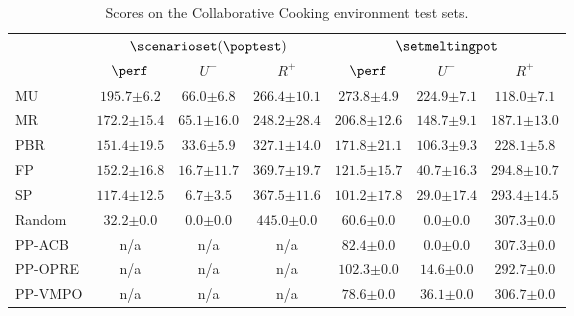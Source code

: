 \begin{table}[t]
    \setlength{\tabcolsep}{2.6pt}
    \centering
    \caption{Scores on the Collaborative Cooking environment test sets.}
    \label{tab:cooking.test}
    \begin{adjustbox}{center}

    \begin{tabular}{lcccccc}\toprule
    & \multicolumn{3}{c}{$\scenarioset(\poptest)$} & \multicolumn{3}{c}{$\setmeltingpot$}
    \\\cmidrule(lr){2-4}\cmidrule(lr){5-7}
               & $\perf$ & $U^-$ & $R^+$ & $\perf$ & $U^-$ & $R^+$ \\ \midrule
            MU & $\mathbf{195.7 {\scriptscriptstyle\pm 6.2}}$ & $\mathbf{66.0 {\scriptscriptstyle\pm 6.8}}$ & $266.4 {\scriptscriptstyle\pm 10.1}$ & $\mathbf{273.8 {\scriptscriptstyle\pm 4.9}}$ & $\mathbf{224.9 {\scriptscriptstyle\pm 7.1}}$ & $\mathbf{118.0 {\scriptscriptstyle\pm 7.1}}$ \\
            MR & $172.2 {\scriptscriptstyle\pm 15.4}$ & $65.1 {\scriptscriptstyle\pm 16.0}$ & $\mathbf{248.2 {\scriptscriptstyle\pm 28.4}}$ & $206.8 {\scriptscriptstyle\pm 12.6}$ & $148.7 {\scriptscriptstyle\pm 9.1}$ & $187.1 {\scriptscriptstyle\pm 13.0}$ \\ \hdashline
            PBR & $151.4 {\scriptscriptstyle\pm 19.5}$ & $33.6 {\scriptscriptstyle\pm 5.9}$ & $327.1 {\scriptscriptstyle\pm 14.0}$ & $171.8{\scriptscriptstyle \pm 21.1}$ & $106.3 {\scriptscriptstyle\pm 9.3}$ & $228.1 {\scriptscriptstyle\pm 5.8}$ \\
            FP & $152.2 {\scriptscriptstyle\pm 16.8}$ & $16.7 {\scriptscriptstyle\pm 11.7}$ & $369.7 {\scriptscriptstyle\pm 19.7}$ & $121.5 {\scriptscriptstyle\pm 15.7}$ & $40.7 {\scriptscriptstyle\pm 16.3}$ & $294.8 {\scriptscriptstyle\pm 10.7}$ \\
            SP & $117.4 {\scriptscriptstyle\pm 12.5}$ & $6.7 {\scriptscriptstyle\pm 3.5}$ & $367.5 {\scriptscriptstyle\pm 11.6}$ & $101.2 {\scriptscriptstyle\pm 17.8}$ & $29.0 {\scriptscriptstyle\pm 17.4}$ & $293.4 {\scriptscriptstyle\pm 14.5}$ \\
            Random & $32.2 {\scriptscriptstyle\pm 0.0}$ & $0.0 {\scriptscriptstyle\pm 0.0}$ & $445.0 {\scriptscriptstyle\pm 0.0}$ & $60.6 {\scriptscriptstyle\pm 0.0}$ & $0.0 {\scriptscriptstyle\pm 0.0}$ & $307.3 {\scriptscriptstyle\pm 0.0}$ \\ 
            PP-ACB & n/a & n/a & n/a & $82.4 {\scriptscriptstyle\pm 0.0}$ & $0.0 {\scriptscriptstyle\pm 0.0}$ & $307.3 {\scriptscriptstyle\pm 0.0}$ \\
            PP-OPRE & n/a & n/a & n/a & $102.3 {\scriptscriptstyle\pm 0.0}$ & $14.6 {\scriptscriptstyle\pm 0.0}$ & $292.7 {\scriptscriptstyle\pm 0.0}$ \\
            PP-VMPO & n/a & n/a & n/a & $78.6 {\scriptscriptstyle\pm 0.0}$ & $36.1 {\scriptscriptstyle\pm 0.0}$ & $306.7 {\scriptscriptstyle\pm 0.0}$ \\
    \bottomrule
    \end{tabular}
    \end{adjustbox}
\end{table}

